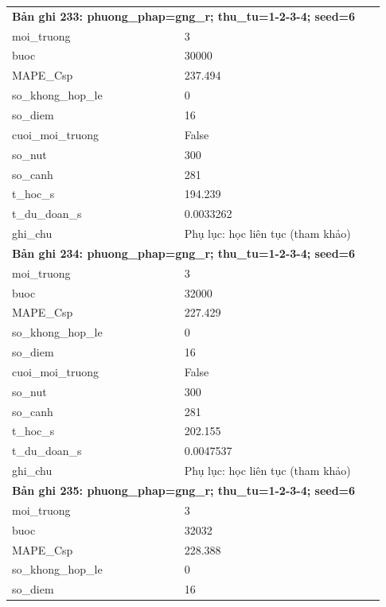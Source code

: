 \begin{longtable}{p{0.43\linewidth}p{0.50\linewidth}}
\midrule
\multicolumn{2}{p{0.95\linewidth}}{\textbf{Bản ghi 233: phuong\_phap=gng\_r; thu\_tu=1-2-3-4; seed=6}} \\
moi\_\allowbreak truong & 3 \\
buoc & 30000 \\
MAPE\_\allowbreak Csp & 237.494 \\
so\_\allowbreak khong\_\allowbreak hop\_\allowbreak le & 0 \\
so\_\allowbreak diem & 16 \\
cuoi\_\allowbreak moi\_\allowbreak truong & False \\
so\_\allowbreak nut & 300 \\
so\_\allowbreak canh & 281 \\
t\_\allowbreak hoc\_\allowbreak s & 194.239 \\
t\_\allowbreak du\_\allowbreak doan\_\allowbreak s & 0.0033262 \\
ghi\_\allowbreak chu & Phụ lục: học liên tục (tham khảo) \\
\midrule
\multicolumn{2}{p{0.95\linewidth}}{\textbf{Bản ghi 234: phuong\_phap=gng\_r; thu\_tu=1-2-3-4; seed=6}} \\
moi\_\allowbreak truong & 3 \\
buoc & 32000 \\
MAPE\_\allowbreak Csp & 227.429 \\
so\_\allowbreak khong\_\allowbreak hop\_\allowbreak le & 0 \\
so\_\allowbreak diem & 16 \\
cuoi\_\allowbreak moi\_\allowbreak truong & False \\
so\_\allowbreak nut & 300 \\
so\_\allowbreak canh & 281 \\
t\_\allowbreak hoc\_\allowbreak s & 202.155 \\
t\_\allowbreak du\_\allowbreak doan\_\allowbreak s & 0.0047537 \\
ghi\_\allowbreak chu & Phụ lục: học liên tục (tham khảo) \\
\midrule
\multicolumn{2}{p{0.95\linewidth}}{\textbf{Bản ghi 235: phuong\_phap=gng\_r; thu\_tu=1-2-3-4; seed=6}} \\
moi\_\allowbreak truong & 3 \\
buoc & 32032 \\
MAPE\_\allowbreak Csp & 228.388 \\
so\_\allowbreak khong\_\allowbreak hop\_\allowbreak le & 0 \\
so\_\allowbreak diem & 16 \\

\end{longtable}
